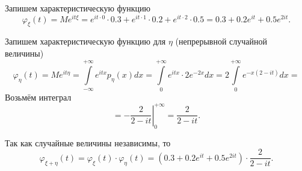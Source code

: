 Запишем характеристическую функцию
\begin{equation*}
  \varphi_{ \xi } \left( t \right) =
  Me^{it \xi } =
  e^{it \cdot 0} \cdot 0.3 + e^{it \cdot 1} \cdot 0.2 +
  e^{it \cdot 2} \cdot 0.5 =
  0.3 + 0.2 e^{it} + 0.5 e^{2it}.
\end{equation*}

Запишем характеристическую функцию для $ \eta $ (непрерывной случайной величины)
\begin{equation*}
  \varphi_{ \eta } \left( t \right) =
  Me^{it \eta } =
  \int \limits_{-\infty }^{+\infty } e^{itx} p_{ \eta } \left( x \right) dx =
  \int \limits_0^{+\infty } e^{itx} \cdot 2 e^{-2x} dx =
  2 \int \limits_0^{+\infty } e^{-x \left( 2 - it \right) } dx =
\end{equation*}
Возьмём интеграл
\begin{equation*}
  = \left. -\frac{2}{2 - it} \right|_0^{+\infty } =
  \frac{2}{2 - it}.
\end{equation*}

Так как случайные величины независимы, то
\begin{equation*}
  \varphi_{ \xi + \eta } \left( t \right) =
  \varphi_{ \xi } \left( t \right) \cdot \varphi_{ \eta } \left( t \right) =
  \left( 0.3 + 0.2 e^{it} + 0.5 e^{2it} \right) \cdot \frac{2}{2 - it}.
\end{equation*}
